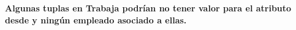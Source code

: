 \textbf{Algunas tuplas en Trabaja podrían no tener valor para el atributo desde y ningún empleado asociado a ellas.}\vspace{.3cm}
